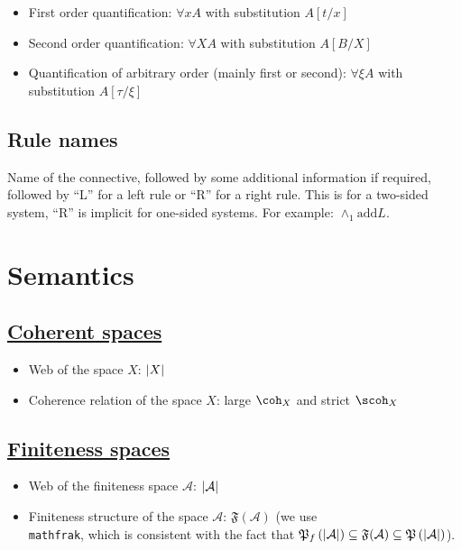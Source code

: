 \begin{itemize}
\item
  First order quantification:
  $\forall x
  A$ with substitution
  $A[t/x]$
\item
  Second order quantification:
  $\forall X
  A$ with substitution
  $A[B/X]$
\item
  Quantification of arbitrary order (mainly first or second):
  $\forall\xi
  A$ with substitution
  $A[\tau/\xi]$
\end{itemize}

\subsection{Rule names}\label{rule-names}

Name of the connective, followed by some additional information if
required, followed by ``L'' for a left rule or ``R'' for a right rule. This
is for a two-sided system, ``R'' is implicit for one-sided systems. For
example: $\wedge_1
\text{add} L$.

\section{Semantics}

\subsection{\texorpdfstring{\hyperref[coherent-semantics]{Coherent spaces}}{Coherent spaces}}\label{coherent-spaces}

\begin{itemize}
\item Web of the space $X$: $\left|X\right|$
\item Coherence relation of the space $X$: large $\coh_X$ and strict $\scoh_X$
\end{itemize}

\subsection{\texorpdfstring{\hyperref[finiteness-semantics]{Finiteness spaces}}{Finiteness spaces}}\label{finiteness-spaces}

\begin{itemize}
\item
  Web of the finiteness space
  $\mathcal
  A$:
  $\left|\mathcal
  A\right|$
\item
  Finiteness structure of the space
  $\mathcal
  A$:
  $\mathfrak
  F(\mathcal A)$ (we use
  \texttt{\\mathfrak},
  which is consistent with the fact that
  $\mathfrak{P}_f\left(\left|\mathcal
  A\right|\right)\subseteq \mathfrak
  F(\mathcal A)
  \subseteq\mathfrak{P}\left(\left|\mathcal
  A\right|\right)$).
\end{itemize}

